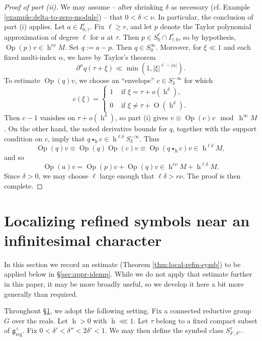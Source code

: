 \documentclass[reqno]{amsart}
\DeclareMathOperator{\h}{h}
\def\O{\operatorname{O}}
\DeclareMathOperator{\Opp}{Op}
\DeclareMathOperator{\reg}{reg}
\theoremstyle{plain} \newtheorem{theorem} {Theorem}
\theoremstyle{definition} \newtheorem{definition} [theorem] {Definition}
\theoremstyle{itplain} %
\numberwithin{equation}{section}
\numberwithin{theorem}{section}
\renewcommand{\geq}{\geqslant}
\begin{document}
\begin{proof}[Proof of part (ii)]
  We may assume -- after shrinking $\delta$ as necessary (cf. Example \ref{example:delta-to-zero-module}) -- that $0 < \delta < \nu$.  In particular, the conclusion of part (i) applies.  Let $a \in I_{0,\tau}^r$.  Fix $\ell \geq r$, and let $p$ denote the Taylor polynomial approximation of degree $\ell$ for $a$ at $\tau$.  Then $p \in S^\ell_0 \cap I_{\tau,0}^r$, so by hypothesis, $\Opp(p) v \in \h^{r \nu} M$.  Set $q := a - p$.  Then $q \in S^\infty_0$.  Moreover, for $\xi \ll 1$ and each fixed multi-index $\alpha$, we have by Taylor's theorem
  \[
    \partial^\alpha q(\tau + \xi) \ll \min(1, |\xi|^{\ell-|\alpha|}).
  \]
  To estimate $\Opp(q) v$, we choose an ``envelope'' $c \in S^{-\infty}_\delta$ for which
  \begin{equation*}
    c(\xi) = \begin{cases}
      1 & \text{ if } \xi = \tau + o(\h^\delta), \\
      0 &  \text{ if } \xi \neq \tau + \O(\h^\delta).
    \end{cases}
  \end{equation*}
  Then $c-1$ vanishes on $\tau + o(\h^\delta)$, so part (i) gives $v \equiv \Opp(c) v \mod{\h^\infty M}$.  On the other hand, the noted derivative bounds for $q$, together with the support condition on $c$, imply that $q \star_{\h} c \in \h^{\ell \delta} S_\delta^{-\infty}$. %
  Thus
  \[
    \Opp(q) v \equiv \Opp(q) \Opp(c) v \equiv \Opp(q \star_{\h} c) v \in \h^{\ell \delta } M,
  \]
  and so
  \[
    \Opp(a) v = \Opp(p) v + \Opp(q) v \in \h^{r \nu} M + \h^{\ell \delta} M.
  \]
  Since $\delta > 0$, we may choose $\ell$ large enough that $\ell \delta > r \nu$.  The proof is then complete.
\end{proof}




\section{Localizing refined symbols near an infinitesimal character
}\label{sec:local-refin-symb}
In this section we record an estimate (Theorem \ref{thm:local-refin-symb}) to be applied below in \S\ref{sec:appr-idemp}.  While we do not apply that estimate further in this paper, it may be more broadly useful, so we develop it here a bit more generally than required.

Throughout \S\ref{sec:local-refin-symb}, we adopt the following setting.  Fix a connected reductive group $G$ over the reals.  Let $\h > 0$ with $\h \lll 1$.  Let $\tau$ belong to a fixed compact subset of $\mathfrak{g}^\wedge_{\reg}$.  Fix $0 < \delta ' < \delta '' < 2 \delta ' < 1$.  We may then define the symbol class $S^\tau_{\delta ', \delta ''}$.
\end{document}
